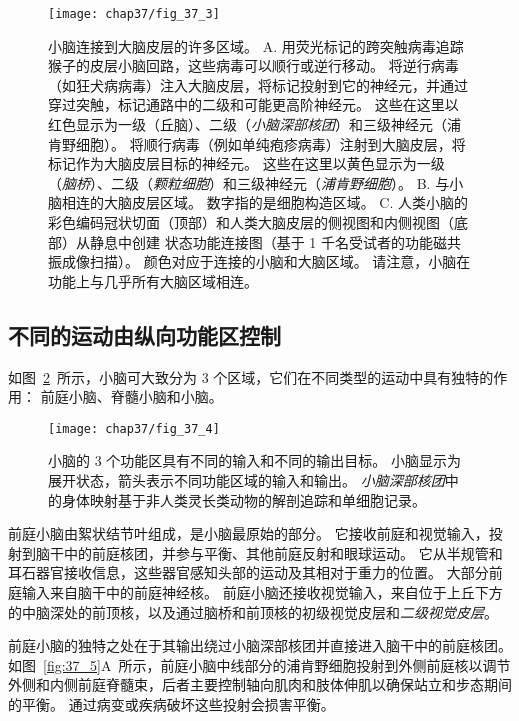 \begin{figure}[htbp]
	\centering
	\texttt{[image: chap37/fig\_37\_3]}
	\caption{小脑连接到大脑皮层的许多区域\cite{bostan2013cerebellar}。
		A. 用荧光标记的跨突触病毒追踪猴子的皮层小脑回路，这些病毒可以顺行或逆行移动。
		将逆行病毒（如狂犬病病毒）注入大脑皮层，将标记投射到它的神经元，并通过穿过突触，标记通路中的二级和可能更高阶神经元。
		这些在这里以红色显示为一级（丘脑）、二级（\textit{小脑深部核团}）和三级神经元（浦肯野细胞）。
		将顺行病毒（例如单纯疱疹病毒）注射到大脑皮层，将标记作为大脑皮层目标的神经元。
		这些在这里以黄色显示为一级（\textit{脑桥}）、二级（\textit{颗粒细胞}）和三级神经元（\textit{浦肯野细胞}）。
		B. 与小脑相连的大脑皮层区域。 数字指的是细胞构造区域。
		C. 人类小脑的彩色编码冠状切面（顶部）和人类大脑皮层的侧视图和内侧视图（底部）从静息中创建 状态功能连接图（基于 1 千名受试者的功能磁共振成像扫描）。
		颜色对应于连接的小脑和大脑区域。
		请注意，小脑在功能上与几乎所有大脑区域相连。}
	\label{fig:37_3}
\end{figure}



\subsection{不同的运动由纵向功能区控制}

如图~\ref{fig:37_4}~所示，小脑可大致分为 3 个区域，它们在不同类型的运动中具有独特的作用：
前庭小脑、脊髓小脑和小脑。


\begin{figure}[htbp]
	\centering
	\texttt{[image: chap37/fig\_37\_4]}
	\caption{小脑的 3 个功能区具有不同的输入和不同的输出目标。
		小脑显示为展开状态，箭头表示不同功能区域的输入和输出。
		\textit{小脑深部核团}中的身体映射基于非人类灵长类动物的解剖追踪和单细胞记录\cite{brooks1981handbook}。}
	\label{fig:37_4}
\end{figure}


前庭小脑由絮状结节叶组成，是小脑最原始的部分。
它接收前庭和视觉输入，投射到脑干中的前庭核团，并参与平衡、其他前庭反射和眼球运动。
它从半规管和耳石器官接收信息，这些器官感知头部的运动及其相对于重力的位置。
大部分前庭输入来自脑干中的前庭神经核。
前庭小脑还接收视觉输入，来自位于上丘下方的中脑深处的前顶核，以及通过脑桥和前顶核的初级视觉皮层和\textit{二级视觉皮层}。


前庭小脑的独特之处在于其输出绕过小脑深部核团并直接进入脑干中的前庭核团。
如图~\ref{fig:37_5}A~所示，前庭小脑中线部分的浦肯野细胞投射到外侧前庭核以调节外侧和内侧前庭脊髓束，后者主要控制轴向肌肉和肢体伸肌以确保站立和步态期间的平衡。
通过病变或疾病破坏这些投射会损害平衡。


